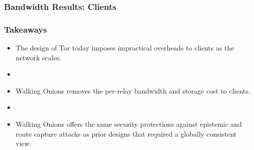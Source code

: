 \documentclass[hyperref={pdfpagelabels=true},table,dvipsnames,14pt,aspectratio=169]{beamer}
\begin{document}
\begin{frame}
\frametitle{Bandwidth Results: Clients}
\begin{center}
  \hspace{-1.7cm}
  \begin{minipage}[t] {0.45\linewidth}
    \vspace*{8em}
  \end{minipage}
  \hspace{0.5cm}
  \begin{minipage}[t] {0.45\linewidth}
    \vspace*{8em}
  \end{minipage}
\end{center}
\end{frame}

\begin{frame}
\frametitle{Takeaways}
  \begin{itemize}
    \item The design of Tor today imposes impractical overheads to clients as
      the network scales.
    \item[]~
    \item Walking Onions removes the per-relay bandwidth and storage cost to
      clients.
    \item[]~
    \item Walking Onions offers the same security protections against epistemic
      and route capture attacks as prior designs that required a globally
      consistent view.
  \end{itemize}
\end{frame}
\end{document}
